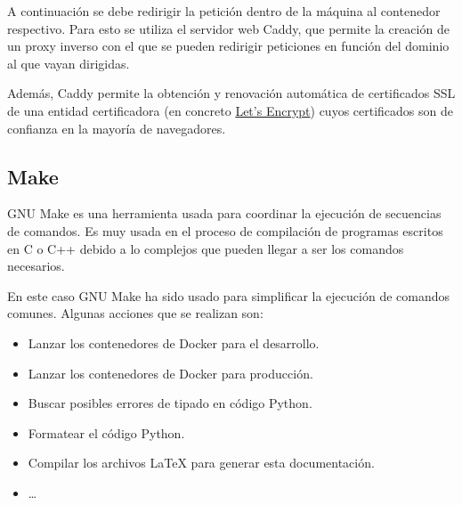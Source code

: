 A continuación se debe redirigir la petición dentro de la máquina al contenedor
respectivo. Para esto se utiliza el servidor web Caddy, que permite la creación
de un proxy inverso con el que se pueden redirigir peticiones en función del
dominio al que vayan dirigidas.

Además, Caddy permite la obtención y renovación automática de certificados SSL
de una entidad certificadora (en concreto \href{https://letsencrypt.org/}{Let's
Encrypt}) cuyos certificados son de confianza en la mayoría de navegadores.

\subsection{Make}

GNU Make es una herramienta usada para coordinar la ejecución de secuencias de
comandos. Es muy usada en el proceso de compilación de programas escritos en C o
C++ debido a lo complejos que pueden llegar a ser los comandos necesarios.

En este caso GNU Make ha sido usado para simplificar la ejecución de comandos
comunes. Algunas acciones que se realizan son:

\begin{itemize}
    \item Lanzar los contenedores de Docker para el desarrollo.
    \item Lanzar los contenedores de Docker para producción.
    \item Buscar posibles errores de tipado en código Python.
    \item Formatear el código Python.
    \item Compilar los archivos \LaTeX{} para generar esta documentación.
    \item \dots
\end{itemize}
